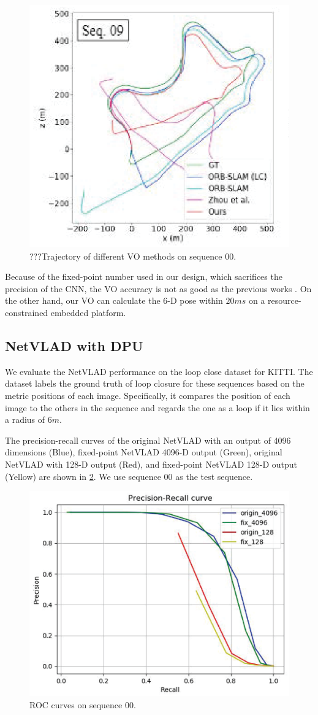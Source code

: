 \begin{figure}[t]
    \centering  
    \includegraphics[width=0.75\linewidth]{fig/VO.eps}
    \caption{???Trajectory of different VO methods on sequence 00.}
    \label{fig:VO}
\end{figure}


Because of the fixed-point number used in our design, which sacrifices the precision of the CNN, the VO accuracy is not as good as the previous works \cite{Mur-Artal:2017281, Zhan:2018e92}. On the other hand, our VO can calculate the 6-D pose within $20ms$ on a resource-constrained embedded platform.

\subsection{NetVLAD with DPU}

We evaluate the NetVLAD performance on the loop close dataset for KITTI\cite{KITTIGroundTruth}.
The dataset labels the ground truth of loop closure for these sequences based on the metric positions of each image. Specifically, it compares the position of each image to the others in the sequence and regards the one as a loop if it lies within a radius of $6m$.

The precision-recall curves of the original NetVLAD with an output of 4096 dimensions (Blue), fixed-point NetVLAD 4096-D output (Green), original NetVLAD with 128-D output (Red), and fixed-point NetVLAD 128-D output (Yellow) are shown in \cref{fig:reloc}. We use sequence 00 as the test sequence.


\begin{figure}[t]
  \centering  
  \includegraphics[width=0.5\linewidth]{fig/val_reloc.eps}
  \caption{ROC curves on sequence 00.}
  \label{fig:reloc}
\end{figure}

